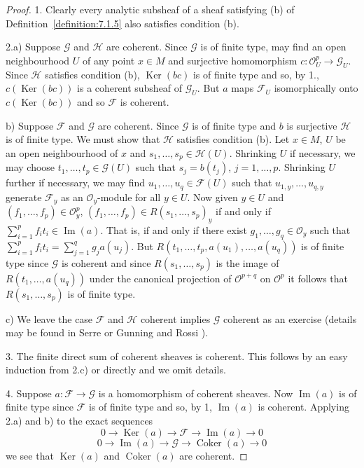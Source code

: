 \begin{proof}
1. Clearly every analytic subsheaf of a sheaf satisfying (b) of Definition~\ref{definition:7.1.5} also satisfies condition (b).

2.a) Suppose $\mathcal{G}$ and $\mathcal{H}$ are coherent. Since $\mathcal{G}$ is of finite type, may find an open neighbourhood $U$ of any point $x\in M$ and surjective homomorphism $c:\mathcal{O}_U^p\to\mathcal{G}_U$. Since $\mathcal{H}$ satisfies condition (b), $\operatorname{Ker}(bc)$ is of finite type and so, by 1., $c(\operatorname{Ker}(bc))$ is a coherent subsheaf of $\mathcal{G}_U$. But $a$ maps $\mathcal{F}_U$ isomorphically onto $c(\operatorname{Ker}(bc))$ and so $\mathcal{F}$ is coherent.

b) Suppose $\mathcal{F}$ and $\mathcal{G}$ are coherent. Since $\mathcal{G}$ is of finite type and $b$ is surjective $\mathcal{H}$ is of finite type. We must show that $\mathcal{H}$ satisfies condition (b). Let $x\in M$, $U$ be an open neighbourhood of $x$ and $s_1,\ldots,s_p\in\mathcal{H}(U)$. Shrinking $U$ if necessary, we may choose $t_1,\ldots,t_p\in\mathcal{G}(U)$ such that $s_j=b(t_j)$, $j=1,\ldots,p$. Shrinking $U$ further if necessary, we may find $u_1,\ldots,u_q\in\mathcal{F}(U)$ such that $u_{1,y},\ldots,u_{q,y}$ generate $\mathcal{F}_y$ as an $\mathcal{O}_y$-module for all $y\in U$. Now given $y\in U$ and $(f_1,\ldots,f_p)\in\mathcal{O}_y^p$, $(f_1,\ldots,f_p)\in R(s_1,\ldots,s_p)_y$ if and only if $\sum_{i=1}^p f_it_i\in\operatorname{Im}(a)$. That is, if and only if there exist $g_1,\ldots,g_q\in\mathcal{O}_y$ such that $\sum_{i=1}^p f_it_i=\sum_{j=1}^q g_ja(u_j)$. But $R(t_1,\ldots,t_p,a(u_1),\ldots,a(u_q))$ is of finite type since $\mathcal{G}$ is coherent and since $R(s_1,\ldots,s_p)$ is the image of $R(t_1,\ldots,a(u_q))$ under the canonical projection of $\mathcal{O}^{p+q}$ on $\mathcal{O}^p$ it follows that $R(s_1,\ldots,s_p)$ is of finite type.

c) We leave the case $\mathcal{F}$ and $\mathcal{H}$ coherent implies $\mathcal{G}$ coherent as an exercise (details may be found in Serre \cite{bib:II:serre-j-p:2} or Gunning and Rossi \cite{bib:II:gunning-r-c-and-rossi-h:1}).

3. The finite direct sum of coherent sheaves is coherent. This follows by an easy induction from 2.c) or directly and we omit details.

4. Suppose $a:\mathcal{F}\to\mathcal{G}$ is a homomorphism of coherent sheaves. Now $\operatorname{Im}(a)$ is of finite type since $\mathcal{F}$ is of finite type and so, by 1, $\operatorname{Im}(a)$ is coherent. Applying 2.a) and b) to the exact sequences
\[
0\to\operatorname{Ker}(a)\to\mathcal{F}\to\operatorname{Im}(a)\to0
\]
\[
0\to\operatorname{Im}(a)\to\mathcal{G}\to\operatorname{Coker}(a)\to0
\]
we see that $\operatorname{Ker}(a)$ and $\operatorname{Coker}(a)$ are coherent.


\end{proof}
